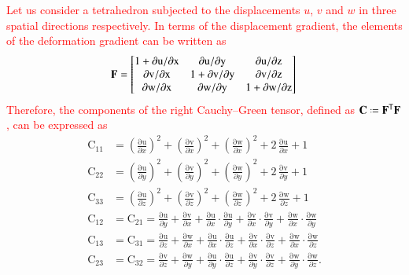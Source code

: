 \textcolor{red}{Let us consider a tetrahedron subjected to the displacements $u$, $v$ and $w$ in three spatial directions respectively. In terms of the displacement gradient, the elements of the deformation gradient can be written as}
\begin{equation}
\mathbf{F} =  
\begin{bmatrix}
1 + \mathrm{\partial u / \partial x} & \mathrm{\partial u / \partial y} & \mathrm{\partial u / \partial z} \\
\mathrm{\partial v / \partial x} & 1 + \mathrm{\partial v / \partial y} & \mathrm{\partial v / \partial z} \\
\mathrm{\partial w / \partial x} & \mathrm{\partial w / \partial y} & 1 + \mathrm{\partial w / \partial z}
\end{bmatrix}\\
\end{equation}	
\textcolor{red}{Therefore, the components of the right Cauchy--Green tensor, defined as $\mathbf{C}\defeq \mathbf{F}^\mathsf{T}\mathbf{F}$, can be expressed as}
\begin{subequations}
    \begin{align}	
    \mathrm{C_{11}} & = \left(\frac{\mathrm{\partial u}}{\partial x}\right)^2 + \left(\frac{\mathrm{\partial v}}{\partial x}\right)^2 + \left(\frac{\mathrm{\partial w}}{\partial x}\right)^2 + 2\, \frac{\mathrm{\partial u}}{\partial x}  + 1\\
    \mathrm{C_{22}} & = \left(\frac{\mathrm{\partial u}}{\partial y}\right)^2 + \left(\frac{\mathrm{\partial v}}{\partial y}\right)^2 + \left(\frac{\mathrm{\partial w}}{\partial y}\right)^2 + 2\, \frac{\mathrm{\partial v}}{\partial y} + 1\\
    \mathrm{C_{33}} & = \left(\frac{\mathrm{\partial u}}{\partial z}\right)^2 + \left(\frac{\mathrm{\partial v}}{\partial z}\right)^2 + \left(\frac{\mathrm{\partial w}}{\partial z}\right)^2 + 2\, \frac{\mathrm{\partial w}}{\partial z} + 1 \\
    \mathrm{C_{12}} & = \mathrm{C_{21}} = \frac{\mathrm{\partial u}}{\partial y} + \frac{\mathrm{\partial v}}{\partial x} + \frac{\mathrm{\partial u}}{\partial x} \cdot \frac{\mathrm{\partial u}}{\partial y} + \frac{\mathrm{\partial v}}{\partial x} \cdot \frac{\mathrm{\partial v}}{\partial y} + \frac{\mathrm{\partial w}}{\partial x} \cdot \frac{\mathrm{\partial w}}{\partial y}\\
    \mathrm{C_{13}} & = \mathrm{C_{31}} = \frac{\mathrm{\partial u}}{\partial z} + \frac{\mathrm{\partial w}}{\partial x} + \frac{\mathrm{\partial u}}{\partial x} \cdot \frac{\mathrm{\partial u}}{\partial z} + \frac{\mathrm{\partial v}}{\partial x} \cdot \frac{\mathrm{\partial v}}{\partial z} + \frac{\mathrm{\partial w}}{\partial x} \cdot \frac{\mathrm{\partial w}}{\partial z} \\
    \mathrm{C_{23}} & = \mathrm{C_{32}} = \frac{\mathrm{\partial v}}{\partial z} + \frac{\mathrm{\partial w}}{\partial y} + \frac{\mathrm{\partial u}}{\partial y} \cdot \frac{\mathrm{\partial u}}{\partial z} + \frac{\mathrm{\partial v}}{\partial y} \cdot \frac{\mathrm{\partial v}}{\partial z} + \frac{\mathrm{\partial w}}{\partial y} \cdot \frac{\mathrm{\partial w}}{\partial z}.
    \end{align}
\end{subequations}
